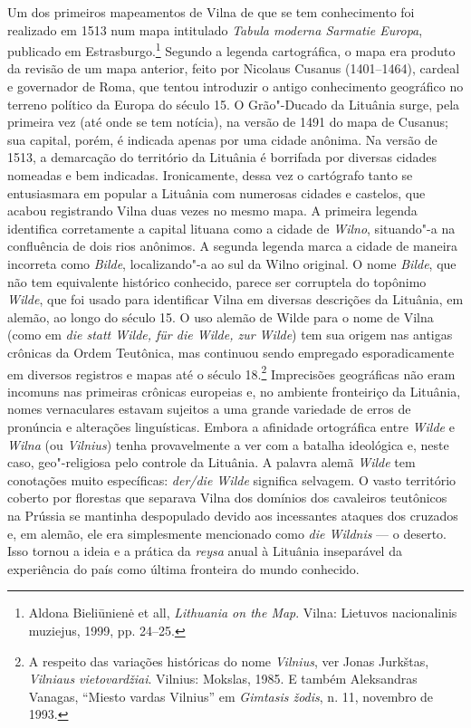Um dos primeiros mapeamentos de Vilna de que se tem conhecimento foi
realizado em 1513 num mapa intitulado \textit{Tabula moderna Sarmatie
Europa}, publicado em Estrasburgo.\footnote{Aldona Bieliūnienė et all, \textit{Lithuania on the Map}. Vilna: Lietuvos nacionalinis muziejus, 1999, pp. 24--25.} Segundo a legenda cartográfica, o mapa era produto da revisão de um mapa anterior, feito por Nicolaus Cusanus
(1401--1464), cardeal e governador de Roma, que tentou introduzir o
antigo conhecimento geográfico no terreno político da Europa do século
15. O Grão"-Ducado da Lituânia surge, pela primeira vez (até onde se tem
notícia), na versão de 1491 do mapa de Cusanus; sua capital, porém, é
indicada apenas por uma cidade anônima. Na versão de 1513, a demarcação
do território da Lituânia é borrifada por diversas cidades nomeadas e
bem indicadas. Ironicamente, dessa vez o cartógrafo tanto se
entusiasmara em popular a Lituânia com numerosas cidades e castelos, que
acabou registrando Vilna duas vezes no mesmo mapa. A primeira legenda
identifica corretamente a capital lituana como a cidade de \textit{Wilno},
situando"-a na confluência de dois rios anônimos. A segunda legenda marca
a cidade de maneira incorreta como \textit{Bilde}, localizando"-a ao sul da
Wilno original. O nome \textit{Bilde}, que não tem equivalente histórico
conhecido, parece ser corruptela do topônimo \textit{Wilde}, que foi usado
para identificar Vilna em diversas descrições da Lituânia, em alemão, ao
longo do século 15. O uso alemão de Wilde para o nome de Vilna (como em
\textit{die statt Wilde, für die Wilde, zur Wilde}) tem sua origem nas
antigas crônicas da Ordem Teutônica, mas continuou sendo empregado
esporadicamente em diversos registros e mapas até o século 18.\footnote{A respeito das variações históricas do nome \textit{Vilnius}, ver Jonas Jurkštas, \textit{Vilniaus vietovardžiai}. Vilnius: Mokslas, 1985. E também Aleksandras Vanagas, ``Miesto vardas Vilnius'' em \textit{Gimtasis žodis}, n. 11, novembro de 1993.}
Imprecisões geográficas não eram incomuns nas primeiras crônicas
europeias e, no ambiente fronteiriço da Lituânia, nomes vernaculares
estavam sujeitos a uma grande variedade de erros de pronúncia e
alterações linguísticas. Embora a afinidade ortográfica entre
\textit{Wilde} e \textit{Wilna} (ou \textit{Vilnius}) tenha provavelmente a ver com a
batalha ideológica e, neste caso, geo"-religiosa pelo controle da
Lituânia. A palavra alemã \textit{Wilde} tem conotações muito específicas:
\textit{der/die Wilde} significa selvagem. O vasto território coberto por
florestas que separava Vilna dos domínios dos cavaleiros teutônicos na
Prússia se mantinha despopulado devido aos incessantes ataques dos
cruzados e, em alemão, ele era simplesmente mencionado como \textit{die
Wildnis} --- o deserto. Isso tornou a ideia e a prática da \textit{reysa}
anual à Lituânia inseparável da experiência do país como última
fronteira do mundo conhecido.

